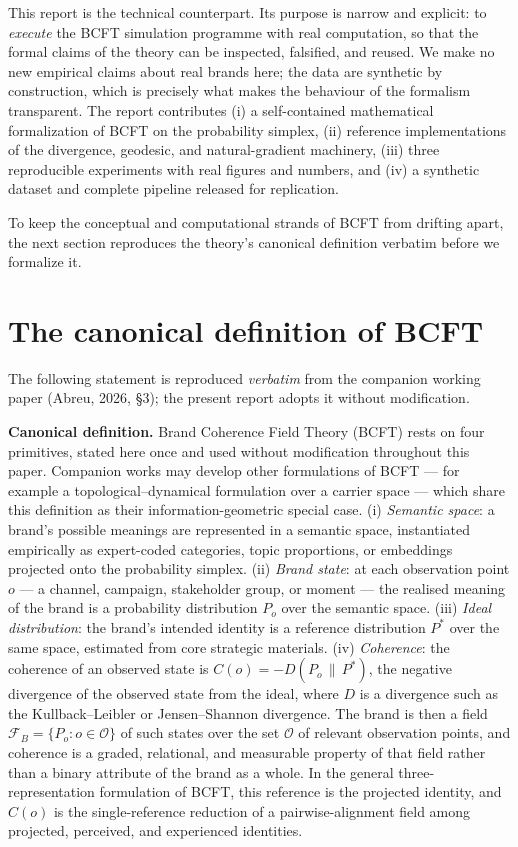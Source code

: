 \documentclass[11pt]{article}
\theoremstyle{remark}
\newcommand{\Pstar}{P^{*}}
\newcommand{\FB}{\mathcal{F}_{B}}
\newcommand{\Obs}{\mathcal{O}}
\begin{document}
This report is the technical counterpart. Its purpose is narrow and explicit:
to \emph{execute} the BCFT simulation programme with real computation, so that
the formal claims of the theory can be inspected, falsified, and reused. We
make no new empirical claims about real brands here; the data are synthetic by
construction, which is precisely what makes the behaviour of the formalism
transparent. The report contributes (i) a self-contained mathematical
formalization of BCFT on the probability simplex, (ii) reference
implementations of the divergence, geodesic, and natural-gradient machinery,
(iii) three reproducible experiments with real figures and numbers, and (iv) a
synthetic dataset and complete pipeline released for replication.

To keep the conceptual and computational strands of BCFT from drifting apart,
the next section reproduces the theory's canonical definition verbatim before we
formalize it.

\section{The canonical definition of BCFT}
The following statement is reproduced \emph{verbatim} from the companion working
paper (Abreu, 2026, \S3); the present report adopts it without modification.

\begin{mdframed}[backgroundcolor=gray!6,linecolor=gray!40,roundcorner=4pt]
\textbf{Canonical definition.} Brand Coherence Field Theory (BCFT) rests on four
primitives, stated here once and used without modification throughout this paper.
Companion works may develop other formulations of BCFT --- for example a
topological--dynamical formulation over a carrier space --- which share this
definition as their information-geometric special case. (i) \emph{Semantic space}: a brand's possible meanings
are represented in a semantic space, instantiated empirically as expert-coded
categories, topic proportions, or embeddings projected onto the probability
simplex. (ii) \emph{Brand state}: at each observation point $o$ --- a channel,
campaign, stakeholder group, or moment --- the realised meaning of the brand is
a probability distribution $P_o$ over the semantic space. (iii) \emph{Ideal
distribution}: the brand's intended identity is a reference distribution
$\Pstar$ over the same space, estimated from core strategic materials.
(iv) \emph{Coherence}: the coherence of an observed state is
$C(o) = -D(P_o \,\|\, \Pstar)$, the negative divergence of the observed state
from the ideal, where $D$ is a divergence such as the Kullback--Leibler or
Jensen--Shannon divergence. The brand is then a field
$\FB = \{P_o : o \in \Obs\}$ of such states over the set $\Obs$ of relevant
observation points, and coherence is a graded, relational, and measurable
property of that field rather than a binary attribute of the brand as a whole.
In the general three-representation formulation of BCFT, this reference is the
projected identity, and $C(o)$ is the single-reference reduction of a
pairwise-alignment field among projected, perceived, and experienced identities.
\end{mdframed}
\end{document}
